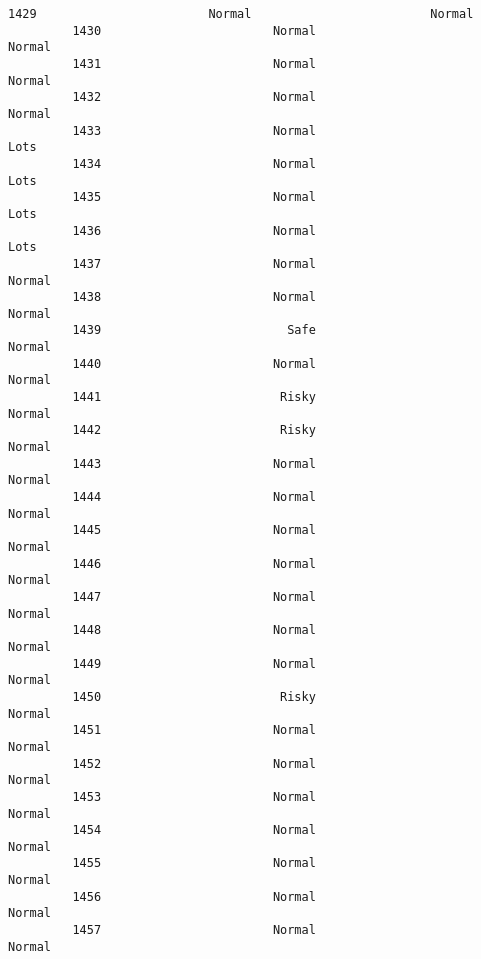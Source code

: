 \documentclass[11pt]{article}
\begin{document}
\begin{Verbatim}[commandchars=\\\{\}]
         1429                        Normal                         Normal   
         1430                        Normal                         Normal   
         1431                        Normal                         Normal   
         1432                        Normal                         Normal   
         1433                        Normal                           Lots   
         1434                        Normal                           Lots   
         1435                        Normal                           Lots   
         1436                        Normal                           Lots   
         1437                        Normal                         Normal   
         1438                        Normal                         Normal   
         1439                          Safe                         Normal   
         1440                        Normal                         Normal   
         1441                         Risky                         Normal   
         1442                         Risky                         Normal   
         1443                        Normal                         Normal   
         1444                        Normal                         Normal   
         1445                        Normal                         Normal   
         1446                        Normal                         Normal   
         1447                        Normal                         Normal   
         1448                        Normal                         Normal   
         1449                        Normal                         Normal   
         1450                         Risky                         Normal   
         1451                        Normal                         Normal   
         1452                        Normal                         Normal   
         1453                        Normal                         Normal   
         1454                        Normal                         Normal   
         1455                        Normal                         Normal   
         1456                        Normal                         Normal   
         1457                        Normal                         Normal   
         

\end{Verbatim}
\end{document}
